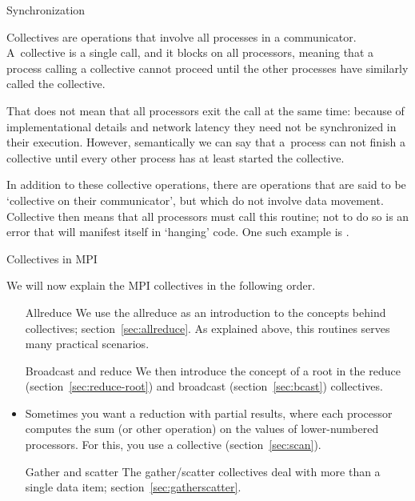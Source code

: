 
 {Synchronization}

Collectives are operations that involve all processes in a
communicator. %
A~collective is a
single call, and it blocks on all processors,
meaning that a process calling a collective cannot proceed
until the other processes have similarly called the collective.

That does not mean that
all processors exit the call at the same time: because of
implementational details and network
latency they need not be synchronized in their execution.
However, semantically we can say that
a~process can not finish
a collective until every other process has at least started the collective.

In addition to these collective operations, there are operations that
are said to be `collective on their communicator', but which do not
involve data movement. Collective then means that all processors must
call this routine; not to do so is an error that will 
manifest itself in `hanging' code. One such example is
.

 {Collectives in MPI}

We will now explain the MPI collectives in the following order.
\begin{itemize}
\item[Allreduce] We use the allreduce as an introduction to the
  concepts behind collectives; section~\ref{sec:allreduce}. As
  explained above, this routines serves many practical scenarios.
\item[Broadcast and reduce] We then introduce the concept of a root
  in the reduce (section~\ref{sec:reduce-root}) and broadcast
  (section~\ref{sec:bcast}) collectives.
\item Sometimes you want a reduction with partial results, where each processor
  computes the sum (or other operation) on the values of lower-numbered processors.
  For this, you use a  collective (section~\ref{sec:scan}).
\item[Gather and scatter] The gather/scatter collectives deal with
  more than a single data item; section~\ref{sec:gatherscatter}.
\end{itemize}

